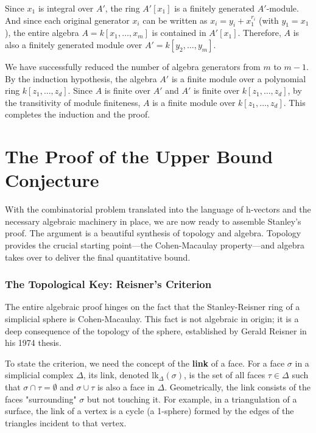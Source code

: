 \documentclass[11pt]{article}
\begin{document}
\begin{itemize}
\begin{itemize}
        Since $x_1$ is integral over $A'$, the ring $A'[x_1]$ is a finitely generated $A'$-module. And since each original generator $x_i$ can be written as $x_i = y_i + x_1^{r_i}$ (with $y_1=x_1$), the entire algebra $A = k[x_1, \ldots, x_m]$ is contained in $A'[x_1]$. Therefore, $A$ is also a finitely generated module over $A' = k[y_2, \ldots, y_m]$.

        We have successfully reduced the number of algebra generators from $m$ to $m-1$. By the induction hypothesis, the algebra $A'$ is a finite module over a polynomial ring $k[z_1, \ldots, z_d]$. Since $A$ is finite over $A'$ and $A'$ is finite over $k[z_1, \ldots, z_d]$, by the transitivity of module finiteness, $A$ is a finite module over $k[z_1, \ldots, z_d]$. This completes the induction and the proof.
    \end{itemize}
\end{itemize}

\part{The Proof of the Upper Bound Conjecture}

With the combinatorial problem translated into the language of h-vectors and the necessary algebraic machinery in place, we are now ready to assemble Stanley's proof. The argument is a beautiful synthesis of topology and algebra. Topology provides the crucial starting point—the Cohen-Macaulay property—and algebra takes over to deliver the final quantitative bound.

\section{The Topological Key: Reisner's Criterion}

The entire algebraic proof hinges on the fact that the Stanley-Reisner ring of a simplicial sphere is Cohen-Macaulay. This fact is not algebraic in origin; it is a deep consequence of the topology of the sphere, established by Gerald Reisner in his 1974 thesis.

To state the criterion, we need the concept of the \textbf{link} of a face. For a face $\sigma$ in a simplicial complex $\Delta$, its link, denoted $\text{lk}_\Delta(\sigma)$, is the set of all faces $\tau \in \Delta$ such that $\sigma \cap \tau = \emptyset$ and $\sigma \cup \tau$ is also a face in $\Delta$. Geometrically, the link consists of the faces "surrounding" $\sigma$ but not touching it. For example, in a triangulation of a surface, the link of a vertex is a cycle (a 1-sphere) formed by the edges of the triangles incident to that vertex.
\end{document}
